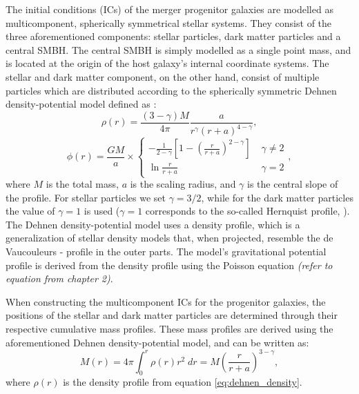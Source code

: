 \documentclass[english, oneside]{HYgradu}
\begin{document}
The initial conditions (ICs) of the merger progenitor galaxies are modelled as multicomponent, spherically symmetrical stellar systems. They consist of the three aforementioned components: stellar particles, dark matter particles and a central SMBH. The central SMBH is simply modelled as a single point mass, and is located at the origin of the host galaxy's internal coordinate systems. The stellar and dark matter component, on the other hand, consist of multiple particles which are distributed according to the spherically symmetric Dehnen density-potential model defined as \citep{Dehnen1993}:
\begin{equation}
\rho(r) = \frac{(3-\gamma)M}{4\pi} \frac{a}{r^\gamma (r+a)^{4-\gamma}}, \label{eq:dehnen_density}
\end{equation}
\begin{equation}
\phi(r) = \frac{GM}{a} \times 
\begin{cases}
	-\frac{1}{2-\gamma} \left[ 1 - \left( \frac{r}{r+a} \right)^{2-\gamma} \right] & \; \gamma \neq 2 \\
	\ln \frac{r}{r+a}	 & \; \gamma = 2
\end{cases},
\label{eq:dehnen_potential}
\end{equation}
where $M$ is the total mass, $a$ is the scaling radius, and $\gamma$ is the central slope of the profile. For stellar particles we set $\gamma = 3/2$, while for the dark matter particles the value of $\gamma = 1$ is used ($\gamma = 1$ corresponds to the so-called Hernquist profile, \citealt{Hernquist1990}). The Dehnen density-potential model uses a density profile, which is a generalization of stellar density models that, when projected, resemble the de Vaucouleurs - profile \citep[$\log(\mu) \propto R^{1/4}$;][]{deVaucouleurs1948} in the outer parts. The model's gravitational potential profile is derived from the density profile using the Poisson equation \textit{(refer to equation from chapter 2)}. 

When constructing the multicomponent ICs for the progenitor galaxies, the positions of the stellar and dark matter particles are determined through their respective cumulative mass profiles. These mass profiles are derived using the aforementioned Dehnen density-potential model, and can be written as:
\begin{equation}
M(r) = 4\pi \int^r_0 \rho(r)r^2 \;dr = M \left( \frac{r}{r+a} \right)^{3-\gamma}, \label{eq:cumulative_mass}
\end{equation}
where $\rho(r)$ is the density profile from equation \ref{eq:dehnen_density}.
\end{document}
